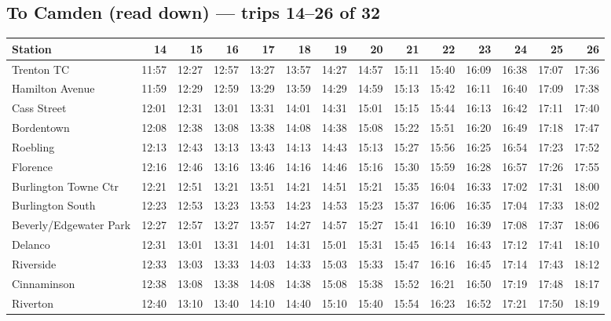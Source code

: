 \subsection*{To Camden (read down) --- trips 14--26 of 32}
\begin{center}\footnotesize\setlength{\tabcolsep}{3pt}\begin{tabular}{@{}lrrrrrrrrrrrrr@{}}\toprule
Station & 14 & 15 & 16 & 17 & 18 & 19 & 20 & 21 & 22 & 23 & 24 & 25 & 26 \\\midrule
Trenton TC & 11:57 & 12:27 & 12:57 & 13:27 & 13:57 & 14:27 & 14:57 & 15:11 & 15:40 & 16:09 & 16:38 & 17:07 & 17:36 \\
Hamilton Avenue & 11:59 & 12:29 & 12:59 & 13:29 & 13:59 & 14:29 & 14:59 & 15:13 & 15:42 & 16:11 & 16:40 & 17:09 & 17:38 \\
Cass Street & 12:01 & 12:31 & 13:01 & 13:31 & 14:01 & 14:31 & 15:01 & 15:15 & 15:44 & 16:13 & 16:42 & 17:11 & 17:40 \\
Bordentown & 12:08 & 12:38 & 13:08 & 13:38 & 14:08 & 14:38 & 15:08 & 15:22 & 15:51 & 16:20 & 16:49 & 17:18 & 17:47 \\
Roebling & 12:13 & 12:43 & 13:13 & 13:43 & 14:13 & 14:43 & 15:13 & 15:27 & 15:56 & 16:25 & 16:54 & 17:23 & 17:52 \\
Florence & 12:16 & 12:46 & 13:16 & 13:46 & 14:16 & 14:46 & 15:16 & 15:30 & 15:59 & 16:28 & 16:57 & 17:26 & 17:55 \\
Burlington Towne Ctr & 12:21 & 12:51 & 13:21 & 13:51 & 14:21 & 14:51 & 15:21 & 15:35 & 16:04 & 16:33 & 17:02 & 17:31 & 18:00 \\
Burlington South & 12:23 & 12:53 & 13:23 & 13:53 & 14:23 & 14:53 & 15:23 & 15:37 & 16:06 & 16:35 & 17:04 & 17:33 & 18:02 \\
Beverly/Edgewater Park & 12:27 & 12:57 & 13:27 & 13:57 & 14:27 & 14:57 & 15:27 & 15:41 & 16:10 & 16:39 & 17:08 & 17:37 & 18:06 \\
Delanco & 12:31 & 13:01 & 13:31 & 14:01 & 14:31 & 15:01 & 15:31 & 15:45 & 16:14 & 16:43 & 17:12 & 17:41 & 18:10 \\
Riverside & 12:33 & 13:03 & 13:33 & 14:03 & 14:33 & 15:03 & 15:33 & 15:47 & 16:16 & 16:45 & 17:14 & 17:43 & 18:12 \\
Cinnaminson & 12:38 & 13:08 & 13:38 & 14:08 & 14:38 & 15:08 & 15:38 & 15:52 & 16:21 & 16:50 & 17:19 & 17:48 & 18:17 \\
Riverton & 12:40 & 13:10 & 13:40 & 14:10 & 14:40 & 15:10 & 15:40 & 15:54 & 16:23 & 16:52 & 17:21 & 17:50 & 18:19 \\

\end{tabular}
\end{center}
